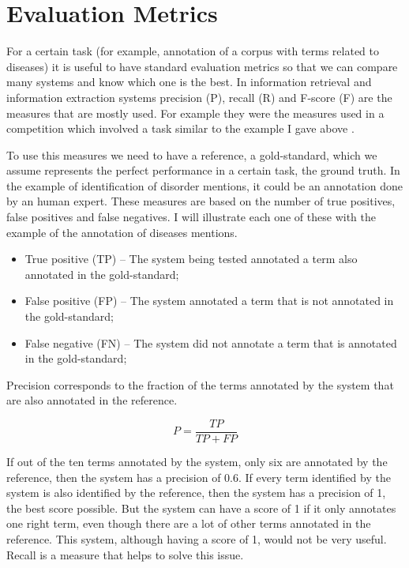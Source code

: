 \section{Evaluation Metrics}
\label{Evaluation Metrics}

For a certain task (for example, annotation of a corpus with terms related to diseases) it is useful to have standard evaluation metrics so that we can compare many systems and know which one is the best. In information retrieval and information extraction systems precision (P), recall (R) and F-score (F) are the measures that are mostly used. For example they were the measures used in a competition which involved a task similar to the example I gave above \citep{Elhadad2015}.

To use this measures we need to have a reference, a gold-standard, which we assume represents the perfect performance in a certain task, the ground truth. In the example of identification of disorder mentions, it could be an annotation done by an human expert. These measures are based on the number of true positives, false positives and false negatives. I will illustrate each one of these with the example of the annotation of diseases mentions.

\begin{itemize}
\item True positive (TP) – The system being tested annotated a term also annotated in the gold-standard;
\item False positive (FP) – The system annotated a term that is not annotated in the gold-standard;
\item False negative (FN) – The system did not annotate a term that is annotated in the gold-standard;
\end{itemize}

Precision corresponds to the fraction of the terms annotated by the system that are also annotated in the reference.

\begin{equation}
P = \frac{TP}{TP+FP}
\end{equation}

If out of the ten terms annotated by the system, only six are annotated by the reference, then the system has a precision of 0.6. If every term identified by the system is also identified by the reference, then the system has a precision of 1, the best score possible. But the system can have a score of 1 if it only annotates one right term, even though there are a lot of other terms annotated in the reference. This system, although having a score of 1, would not be very useful. Recall is a measure that helps to solve this issue.

